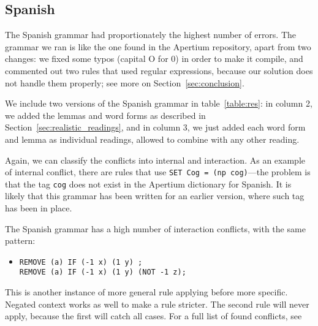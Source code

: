 
\subsection{Spanish} The Spanish grammar had proportionately the
highest number of errors. The grammar we ran is like the one
found in the Apertium repository, apart from two changes: we fixed
some typos (capital O for 0) in order to make it compile, and
commented out two rules that used regular expressions, because our
solution does not handle them properly; see more on Section~\ref{sec:conclusion}.

We include two versions of the Spanish grammar in table~\ref{table:res}: in column 2, we added the lemmas and word forms as described in Section~\ref{sec:realistic_readings}, and in column 3, we just added each word form and lemma as individual readings, allowed to combine with any other reading. 

Again, we can classify the conflicts into internal and interaction. As an example of internal conflict, there are  rules that use \texttt{SET Cog = (np cog)}---the problem is that the tag \texttt{cog} does not exist in the Apertium dictionary for Spanish. It is likely that this grammar has been written for an earlier version, where such tag has been in place.


The Spanish grammar has a high number of interaction conflicts,  with the same pattern:

\begin{itemize}
\item[] 
\begin{verbatim}REMOVE (a) IF (-1 x) (1 y) ;
REMOVE (a) IF (-1 x) (1 y) (NOT -1 z);
\end{verbatim}
\end{itemize}


This is another instance of more general rule applying before more
specific. Negated context works as well to make a rule stricter. The
second rule will never apply, because the first will catch all
cases. For a full list of found conflicts, see 


